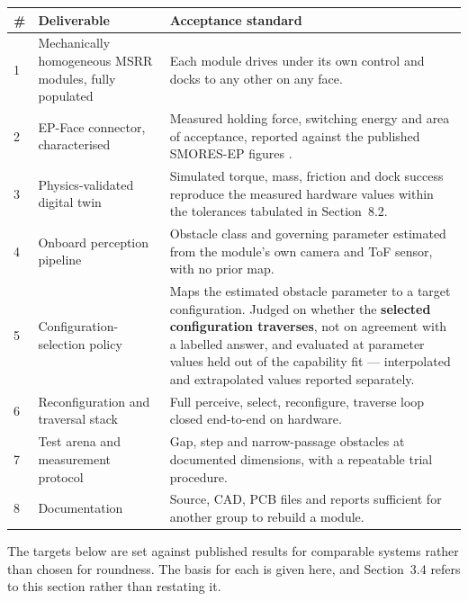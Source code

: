 \documentclass[11pt,a4paper]{article}
\newif\ifreview
\newcommand{\pending}[1]{\ifreview{\color{blue}#1}\else#1\fi}
\newenvironment{pblock}{\ifreview\color{blue}\fi}{}
\newcounter{gsec}
\newcounter{gsub}
\newcommand{\curgsec}{}
\newcommand{\gsep}{\texorpdfstring{\quad}{ }}
\newcommand{\gtocsub}[2]{%
  \phantomsection
  \addcontentsline{toc}{subsection}{#1\gsep #2}%
}
\newcommand{\gsubsection}[1]{%
  \refstepcounter{gsub}%
  \edef\gsublbl{\curgsec.\thegsub}%
  \expandafter\gtocsub\expandafter{\gsublbl}{#1}%
  \subsection*{\gsublbl\quad #1}%
}
\begin{document}
\pending{}

\begin{pblock}
\begin{longtable}{@{}l L{0.40\textwidth} L{0.42\textwidth}@{}}
\toprule
\textbf{\#} & \textbf{Deliverable} & \textbf{Acceptance standard} \\
\midrule
{} & Mechanically homogeneous MSRR modules, fully populated &
     Each module drives under its own control and docks to any other on any
     face. \\
2 & EP-Face connector, characterised &
     Measured holding force, switching energy and area of acceptance, reported
     against the published SMORES-EP figures \cite{tosun2016}. \\
3 & Physics-validated digital twin &
     Simulated torque, mass, friction and dock success reproduce the measured
     hardware values within the tolerances tabulated in Section~8.2. \\
4 & Onboard perception pipeline &
     Obstacle class and governing parameter estimated from the module's own
     camera and ToF sensor, with no prior map. \\
5 & Configuration-selection policy &
     Maps the estimated obstacle parameter to a target configuration. Judged on
     whether the \textbf{selected configuration traverses}, not on agreement
     with a labelled answer, and evaluated at parameter values held out of the
     capability fit --- interpolated and extrapolated values reported
     separately. \\
6 & Reconfiguration and traversal stack &
     Full perceive, select, reconfigure, traverse loop closed end-to-end on
     hardware. \\
7 & Test arena and measurement protocol &
     Gap, step and narrow-passage obstacles at documented dimensions, with a
     repeatable trial procedure. \\
8 & Documentation &
     Source, CAD, PCB files and reports sufficient for another group to rebuild
     a module. \\
\bottomrule
\end{longtable}
\end{pblock}

\pending{}

\pending{%
The targets below are set against published results for comparable systems
rather than chosen for roundness. The basis for each is given here, and
Section~3.4 refers to this section rather than restating it.
}
\end{document}
